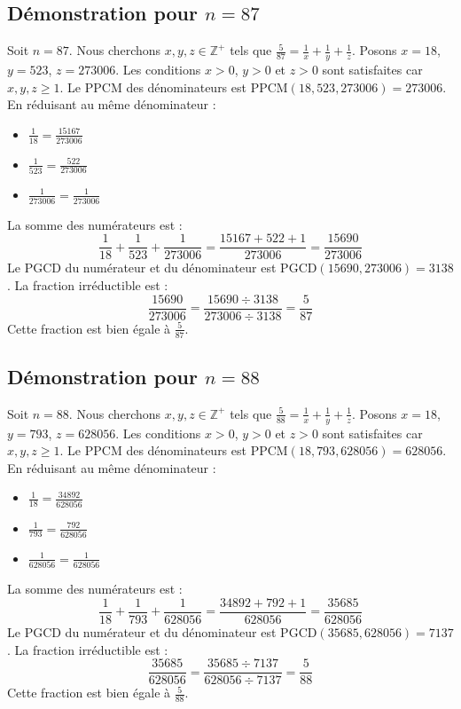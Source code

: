 \documentclass[11pt,a4paper]{article}
\begin{document}
\subsection{Démonstration pour $n = 87$}
Soit $n = 87$. Nous cherchons $x, y, z \in \mathbb{Z}^{+}$ tels que $\frac{5}{87} = \frac{1}{x} + \frac{1}{y} + \frac{1}{z}$.
Posons $x = 18$, $y = 523$, $z = 273006$.
Les conditions $x > 0$, $y > 0$ et $z > 0$ sont satisfaites car $x, y, z \geq 1$.
Le PPCM des dénominateurs est $\text{PPCM}(18, 523, 273006) = 273006$.
En réduisant au même dénominateur :
\begin{itemize}
    \item $\frac{1}{18} = \frac{15167}{273006}$
    \item $\frac{1}{523} = \frac{522}{273006}$
    \item $\frac{1}{273006} = \frac{1}{273006}$
\end{itemize}
La somme des numérateurs est :
$$ \frac{1}{18} + \frac{1}{523} + \frac{1}{273006} = \frac{15167 + 522 + 1}{273006} = \frac{15690}{273006} $$
Le PGCD du numérateur et du dénominateur est $\text{PGCD}(15690, 273006) = 3138$.
La fraction irréductible est :
$$ \frac{15690}{273006} = \frac{15690 \div 3138}{273006 \div 3138} = \frac{5}{87} $$
Cette fraction est bien égale à $\frac{5}{87}$.

\subsection{Démonstration pour $n = 88$}
Soit $n = 88$. Nous cherchons $x, y, z \in \mathbb{Z}^{+}$ tels que $\frac{5}{88} = \frac{1}{x} + \frac{1}{y} + \frac{1}{z}$.
Posons $x = 18$, $y = 793$, $z = 628056$.
Les conditions $x > 0$, $y > 0$ et $z > 0$ sont satisfaites car $x, y, z \geq 1$.
Le PPCM des dénominateurs est $\text{PPCM}(18, 793, 628056) = 628056$.
En réduisant au même dénominateur :
\begin{itemize}
    \item $\frac{1}{18} = \frac{34892}{628056}$
    \item $\frac{1}{793} = \frac{792}{628056}$
    \item $\frac{1}{628056} = \frac{1}{628056}$
\end{itemize}
La somme des numérateurs est :
$$ \frac{1}{18} + \frac{1}{793} + \frac{1}{628056} = \frac{34892 + 792 + 1}{628056} = \frac{35685}{628056} $$
Le PGCD du numérateur et du dénominateur est $\text{PGCD}(35685, 628056) = 7137$.
La fraction irréductible est :
$$ \frac{35685}{628056} = \frac{35685 \div 7137}{628056 \div 7137} = \frac{5}{88} $$
Cette fraction est bien égale à $\frac{5}{88}$.
\end{document}
